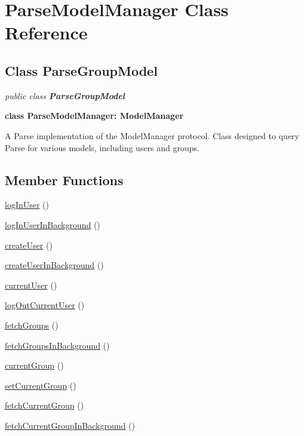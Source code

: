 
\hypertarget{class_ParseModelManager.iOS}{\section{ParseModelManager Class Reference}
\label{class_ParseModelManager.iOS}
}

\subsection*{Class ParseGroupModel}

\textit{public class \textbf{ ParseGroupModel}}

\tab \textbf{class ParseModelManager: ModelManager}

A Parse implementation of the ModelManager protocol. Class designed to query Parse for various models, including users and groups.\\


\subsection*{Member Functions}
\begin{DoxyCompactItemize}
\item 
\hyperlink{class_ParseModelManager.iOS.logInUser}{logInUser} ()
\item 
\hyperlink{class_ParseModelManager.iOS.logInUserInBackground}{logInUserInBackground} ()
\item 
\hyperlink{class_ParseModelManager.iOS.createUser}{createUser} ()
\item 
\hyperlink{class_ParseModelManager.iOS.createUserInBackground}{createUserInBackground} ()
\item 
\hyperlink{class_ParseModelManager.iOS.currentUser}{currentUser} ()
\item 
\hyperlink{class_ParseModelManager.iOS.logOutCurrentUser}{logOutCurrentUser} ()
\item 
\hyperlink{class_ParseModelManager.iOS.fetchGroups}{fetchGroups} ()
\item 
\hyperlink{class_ParseModelManager.iOS.fetchGroupsInBackground}{fetchGroupsInBackground} ()
\item 
\hyperlink{class_ParseModelManager.iOS.currentGroup}{currentGroup} ()
\item 
\hyperlink{class_ParseModelManager.iOS.setCurrentGroup}{setCurrentGroup} ()
\item 
\hyperlink{class_ParseModelManager.iOS.fetchCurrentGroup}{fetchCurrentGroup} ()
\item 
\hyperlink{class_ParseModelManager.iOS.fetchCurrentGroupInBackground}{fetchCurrentGroupInBackground} ()

\end{DoxyCompactItemize}




